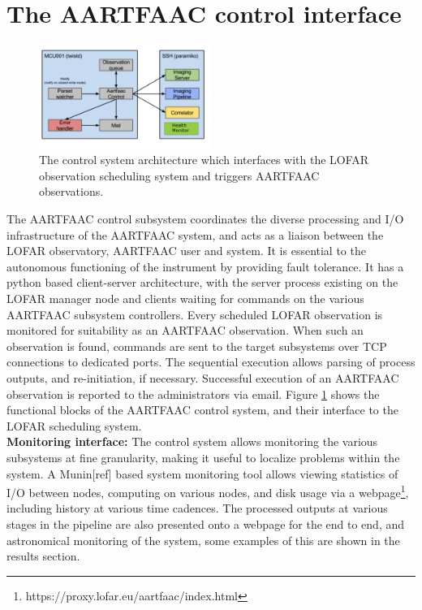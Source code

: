\documentclass{ws-jai}
\begin{document}
\section {\label{sec:acontrol} The AARTFAAC control interface}
\begin{figure}[htbp]
\centering
\includegraphics[width=0.5\textwidth]{Figs/control_sys.png}
\caption{The  control  system  architecture  which  interfaces  with  the  LOFAR
  observation scheduling system and triggers AARTFAAC observations.}
\label{fig:afaac_ctrl_sys}
\end{figure}
The  AARTFAAC  control subsystem  coordinates  the  diverse processing  and  I/O
infrastructure of  the AARTFAAC system, and  acts as a liaison  between the LOFAR
observatory,  AARTFAAC user  and  system.   It is  essential  to the  autonomous
functioning of  the instrument by  providing fault  tolerance.  It has  a python
based client-server architecture, with the  server process existing on the LOFAR
manager node and clients waiting for  commands on the various AARTFAAC subsystem
controllers. Every scheduled  LOFAR observation is monitored  for suitability as
an AARTFAAC observation. When such an observation is found, commands are sent to
the target subsystems  over TCP connections to dedicated  ports.  The sequential
execution   allows   parsing   of   process  outputs,   and   re-initiation,   if
necessary. Successful  execution of an  AARTFAAC observation is reported  to the
administrators via email.  Figure  \ref{fig:afaac_ctrl_sys} shows the functional
blocks  of  the AARTFAAC  control  system,  and  their  interface to  the  LOFAR
scheduling system.\\  

\noindent \textbf  {Monitoring interface:} The control  system allows monitoring
the  various  subsystems at  fine  granularity,  making  it useful  to  localize
problems within  the system.  A  Munin[ref] based system monitoring  tool allows
viewing statistics  of I/O between nodes,  computing on various nodes,  and disk
usage   via    a   webpage\footnote{https://proxy.lofar.eu/aartfaac/index.html},
including history  at various time  cadences.  The processed outputs  at various
stages in the pipeline are also presented onto a webpage for the end to end, and
astronomical monitoring  of the system, some  examples of this are  shown in the
results section.
\end{document}
